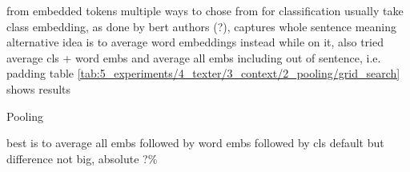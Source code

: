 from embedded tokens multiple ways to chose from
for classification usually take class embedding, as done by bert authors (?), captures whole sentence meaning
alternative idea is to average word embeddings instead
while on it, also tried average cls + word embs and average all embs including out of sentence, i.e. padding
table \ref{tab:5_experiments/4_texter/3_context/2_pooling/grid_search} shows results

\begin{table}[h]
    \centering
    
    \caption{Pooling}
    \label{tab:5_experiments/4_texter/3_context/2_pooling/grid_search}
\end{table}

best is to average all embs followed by word embs followed by cls default
but difference not big, absolute ?\%
